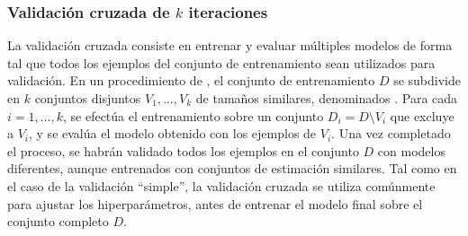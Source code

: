 %
\subsubsection{Validación cruzada de $k$ iteraciones}
\label{s2:crossval}
%
La validación cruzada consiste en entrenar y evaluar 
múltiples modelos de forma tal que todos los ejemplos del conjunto de
entrenamiento sean utilizados para validación.
En un procedimiento de 
\cite{crossval}, el conjunto de entrenamiento $D$ se subdivide en $k$
conjuntos disjuntos $V_1,\ldots,V_k$ de tamaños similares, denominados
.
Para cada $i=1,\ldots,k$, se efectúa el entrenamiento sobre un
conjunto $D_i=D\setminus{}V_i$ que excluye a $V_i$, y se evalúa el
modelo obtenido con los ejemplos de $V_i$.
Una vez completado el proceso, se habrán validado todos los ejemplos en
el conjunto $D$ con modelos diferentes, aunque entrenados con conjuntos
de estimación similares.
Tal como en el caso de la validación ``simple'', la validación cruzada
se utiliza comúnmente para ajustar los hiperparámetros, antes de
entrenar el modelo final sobre el conjunto completo $D$.
